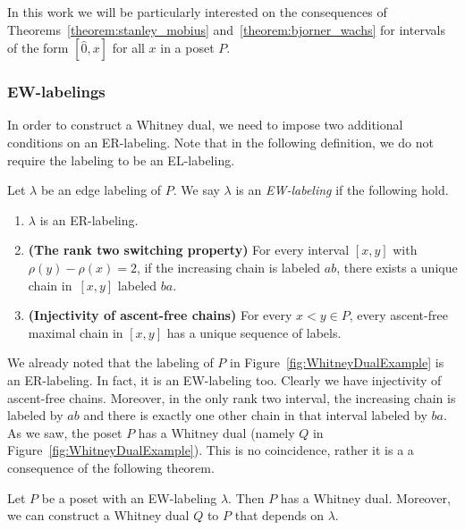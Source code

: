 \begin{rema}
   In this work we will be particularly interested on the consequences of Theorems~\ref{theorem:stanley_mobius} and~\ref{theorem:bjorner_wachs} for intervals of the form $[\hat{0},x]$ for all $x$ in a poset $P$.
\end{rema}

\subsubsection{EW-labelings}
In order to construct a Whitney dual, we need to impose two additional conditions on an ER-labeling.   Note that in the following definition, we do not require the labeling to be an EL-labeling.  

 \begin{defi}\label{definition:EW-labeling}
 Let $\lambda$ be an edge labeling of $P$.  We say $\lambda$ is an \emph{EW-labeling} if the following hold.
 \begin{enumerate}
    \item  $\lambda$ is an ER-labeling.
     \item {\bf (The rank two switching property)} For every interval $[x,y]$ with $\rho(y)-\rho(x)=2$, if the increasing chain is labeled $ab$, there exists a unique chain in~$[x,y]$ labeled  $ba$.  
     \item {\bf (Injectivity of ascent-free chains)} For every $x<y\in P$, every ascent-free maximal chain in $[x,y]$ has a unique sequence of labels.
\end{enumerate}
\end{defi}

We already noted that the labeling of  $P$ in Figure~\ref{fig:WhitneyDualExample} is an ER-labeling.     In fact, it is an EW-labeling too.  Clearly we have injectivity of ascent-free chains.     Moreover, in the only rank two interval, the increasing chain is labeled by $ab$ and there is exactly one other chain in that interval labeled by $ba$.  As we saw, the poset $P$ has a Whitney dual (namely $Q$ in Figure~\ref{fig:WhitneyDualExample}).  This is no coincidence, rather it is a a consequence of the following theorem.

\begin{theo} 
  Let $P$ be a poset with an EW-labeling $\lambda$. Then $P$ has a Whitney dual. Moreover, we can construct a Whitney dual $Q$ to $P$ that depends on $\lambda$.  
\end{theo}

